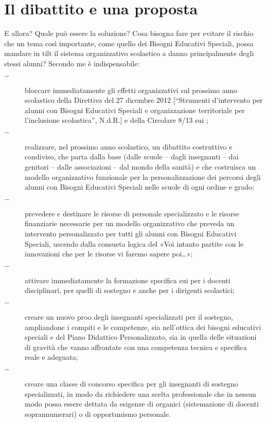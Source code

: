 \section*{Il dibattito e una proposta}
E allora? Quale può essere la soluzione? Cosa bisogna fare per evitare il rischio che un tema così importante, come quello dei Bisogni Educativi Speciali, possa mandare in tilt il sistema organizzativo scolastico a danno principalmente degli stessi alunni?
Secondo me è indispensabile:
\begin{description}
	\item[$-$] bloccare immediatamente gli effetti organizzativi sul prossimo anno scolastico della Direttiva del 27 dicembre 2012 [“Strumenti d'intervento per alunni con Bisogni Educativi Speciali e organizzazione territoriale per l'inclusione scolastica”, N.d.R.] e della Circolare 8/13 sui ;
	\item[$-$] realizzare, nel prossimo anno scolastico, un dibattito costruttivo e condiviso, che parta dalla base (dalle scuole – dagli insegnanti – dai genitori – dalle associazioni – dal mondo della sanità) e che costruisca un modello organizzativo funzionale per la personalizzazione dei percorsi degli alunni con Bisogni Educativi Speciali nelle scuole di ogni ordine e grado;
\item[$-$]  prevedere e destinare le risorse di personale specializzato e le risorse finanziarie necessarie per un modello organizzativo che preveda un intervento personalizzato per tutti gli alunni con Bisogni Educativi Speciali, uscendo dalla consueta logica del «Voi intanto partite con le innovazioni che per le risorse vi faremo sapere poi…»;
	\item[$-$]attivare immediatamente la formazione specifica sui  per i docenti disciplinari, per quelli di sostegno e anche per i dirigenti scolastici;
	\item[$-$]creare un nuovo proo degli insegnanti specializzati per il sostegno, ampliandone i compiti e le competenze, sia nell'ottica dei bisogni educativi speciali e del Piano Didattico Personalizzato, sia in quella delle situazioni di gravità che vanno affrontate con una competenza tecnica e specifica reale e adeguata;
	\item[$-$]creare una classe di concorso specifica per gli insegnanti di sostegno specializzati, in modo da richiedere una scelta professionale che in nessun modo possa essere dettata da esigenze di organici (sistemazione di docenti soprannumerari) o di opportunismo personale.
\end{description}
